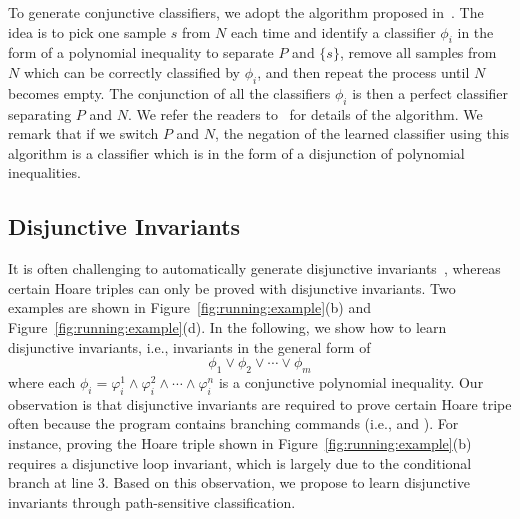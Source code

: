 To generate conjunctive classifiers, we adopt the algorithm proposed in~\cite{sharma2012interpolants}. The idea is to pick one sample $s$ from $N$ each time and identify a classifier $\phi_i$ in the form of a polynomial inequality to separate $P$ and $\{s\}$, remove all samples from $N$ which can be correctly classified by $\phi_i$, and then repeat the process until $N$ becomes empty. The conjunction of all the classifiers $\phi_i$ is then a perfect classifier separating $P$ and $N$. We refer the readers to~\cite{sharma2012interpolants} for details of the algorithm. We remark that if we switch $P$ and $N$, the negation of the learned classifier using this algorithm is a classifier which is in the form of a disjunction of polynomial inequalities.

\subsection{Disjunctive Invariants} \label{disjunctive}
It is often challenging to automatically generate disjunctive invariants~\cite{DBLP:conf/cav/SharmaDDA11,DBLP:conf/pldi/GulwaniSV08}, whereas certain Hoare triples can only be proved with disjunctive invariants. Two examples are shown in Figure~\ref{fig:running:example}(b) and Figure~\ref{fig:running:example}(d). In the following, we show how to learn disjunctive invariants, i.e., invariants in the general form of \[\phi_1 \lor \phi_2 \lor \cdots \lor \phi_m\] where each $\phi_i = \varphi_i^1 \land \varphi_i^2 \land \cdots \land \varphi_i^n$ is a conjunctive polynomial inequality. Our observation is that disjunctive invariants are required to prove certain Hoare tripe often because the program contains branching commands (i.e.,  and ). %
For instance, proving the Hoare triple shown in Figure~\ref{fig:running:example}(b) requires a disjunctive loop invariant, which is largely due to the conditional branch at line 3. Based on this observation, we propose to learn disjunctive invariants through path-sensitive classification.

